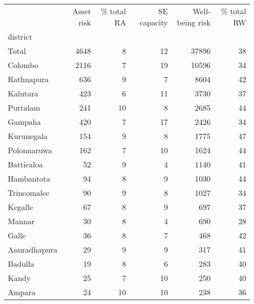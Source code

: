 \begin{tabular}{lrrrrr}
\toprule
{} &  Asset risk &  \% total RA &  SE capacity &  Well-being risk &  \% total RW \\
district     &             &             &              &                  &             \\
\midrule
Total        &        4648 &           8 &           12 &            37896 &          38 \\
Colombo      &        2116 &           7 &           19 &            10596 &          34 \\
Rathnapura   &         636 &           9 &            7 &             8604 &          42 \\
Kalutara     &         423 &           6 &           11 &             3730 &          37 \\
Puttalam     &         241 &          10 &            8 &             2685 &          44 \\
Gampaha      &         420 &           7 &           17 &             2426 &          34 \\
Kurunegala   &         154 &           9 &            8 &             1775 &          47 \\
Polonnaruwa  &         162 &           7 &           10 &             1624 &          44 \\
Batticaloa   &          52 &           9 &            4 &             1140 &          41 \\
Hambantota   &          94 &           8 &            9 &             1030 &          44 \\
Trincomalee  &          90 &           9 &            8 &             1027 &          34 \\
Kegalle      &          67 &           8 &            9 &              697 &          37 \\
Mannar       &          30 &           8 &            4 &              690 &          28 \\
Galle        &          36 &           8 &            7 &              468 &          42 \\
Anuradhapura &          29 &           9 &            9 &              317 &          41 \\
Badulla      &          19 &           8 &            6 &              283 &          40 \\
Kandy        &          25 &           7 &           10 &              250 &          40 \\
Ampara       &          24 &          10 &           10 &              238 &          36 \\

\end{tabular}
